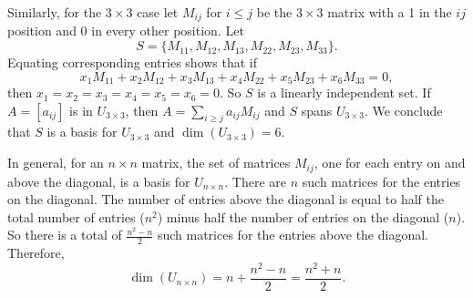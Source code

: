 \begin{example}
Similarly, for the $3 \times 3$ case let $M_{ij}$ for $i \leq j$ be the $3 \times 3$ matrix with a 1 in the $ij$ position and 0 in every other position. Let 
\[S = \{M_{11}, M_{12}, M_{13}, M_{22}, M_{23}, M_{33}\}.\]
Equating corresponding entries shows that if 
\[x_1M_{11} +  x_2M_{12} + x_3M_{13} + x_4 M_{22}+ x_5 M_{23} + x_6M_{33} = 0,\]
then $x_1 = x_2 = x_3 = x_4 = x_5 = x_6 = 0$. So $S$ is a linearly independent set. If $A = [a_{ij}]$ is in $U_{3 \times 3}$, then $A = \sum_{i \geq j} a_{ij}M_{ij}$ and $S$ spans $U_{3 \times 3}$. We conclude that $S$ is a basis for $U_{3 \times 3}$ and $\dim(U_{3 \times 3}) = 6$. 

In general, for an $n \times n$ matrix, the set of matrices $M_{ij}$, one for each entry on and above the diagonal, is a basis for $U_{n \times n}$. There are $n$ such matrices for the entries on the diagonal. The number of entries above the diagonal is equal to half the total number of entries ($n^2$) minus half the number of entries on the diagonal ($n$). So there is a total of $\frac{n^2-n}{2}$ such matrices for the entries above the diagonal. Therefore, 
\[\dim(U_{n \times n}) = n+\frac{n^2-n}{2} = \frac{n^2+n}{2}.\] 


\ea

\end{example}




